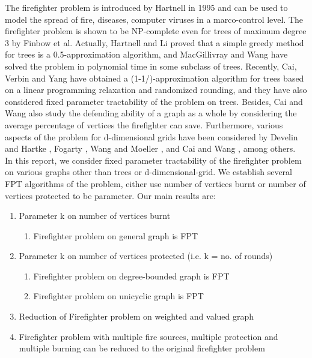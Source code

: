 \documentclass[11pt,letter]{article}
\begin{document}
The firefighter problem is introduced by Hartnell \cite{Har95} in 1995 and can be used to model the spread of fire, diseases, computer viruses in a marco-control level. The firefighter problem is shown to be NP-complete even for trees of maximum degree 3 by Finbow et al. \cite{FKMR07} Actually, Hartnell and Li \cite{HL9} proved that a simple greedy method for trees is a 0.5-approximation algorithm, and MacGillivray and Wang \cite{MW03} have solved the problem in polynomial time in some subclass of trees. Recently, Cai, Verbin and Yang \cite{CVY08} have obtained a (1-1/)-approximation algorithm for trees based on a linear programming relaxation and randomized rounding, and they have also considered fixed parameter tractability of the problem on trees. Besides, Cai and Wang \cite{C09} also study the defending ability of a graph as a whole by considering the average percentage of vertices the firefighter can save. Furthermore, various aspects of the problem for d-dimensional grids have been considered by Develin and Hartke \cite{DH07}, Fogarty \cite{Fog03}, Wang and Moeller \cite{WM02}, and Cai and Wang \cite{C09}, among others.\\

In this report, we consider fixed parameter tractability of the firefighter problem on various graphs other than trees or  d-dimensional-grid. We establish several FPT algorithms of the problem, either use number of vertices burnt or number of vertices protected to be parameter. Our main results are:

\begin{enumerate}
\item Parameter k on number of vertices burnt
\begin{enumerate}
\item Firefighter problem on general graph is FPT
\end{enumerate}
\item Parameter k on number of vertices protected (i.e. k = no. of rounds)
\begin{enumerate}
\item Firefighter problem on degree-bounded graph is FPT

\item  Firefighter problem on unicyclic graph is FPT

\end{enumerate}
\item Reduction of Firefighter problem on weighted and valued graph
\item Firefighter problem with multiple fire sources, multiple protection and multiple burning can be reduced to the original firefighter problem
\end{enumerate}
\end{document}
